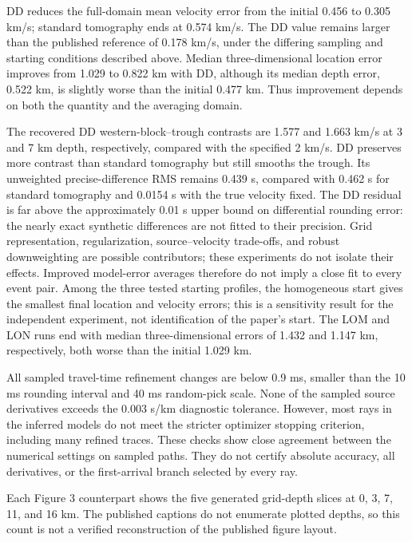 \documentclass[11pt]{article}
\begin{document}
DD reduces the full-domain mean velocity error from the initial 0.456 to
0.305 km/s; standard tomography ends at 0.574 km/s. The DD value remains
larger than the published reference of 0.178 km/s, under the differing
sampling and starting conditions described above. Median three-dimensional
location error improves from 1.029 to 0.822 km with DD, although its median
depth error, 0.522 km, is slightly worse than the initial 0.477 km.
Thus improvement depends on both the quantity and the averaging domain.

The recovered DD western-block--trough contrasts are 1.577 and 1.663 km/s
at 3 and 7 km depth, respectively, compared with the specified 2 km/s.
DD preserves more contrast than standard tomography but still smooths the
trough. Its unweighted precise-difference RMS remains 0.439 s, compared with
0.462 s for standard tomography and 0.0154 s with the true velocity fixed.
The DD residual is far above the approximately 0.01 s upper bound on
differential rounding error: the nearly exact synthetic differences are
not fitted to their precision. Grid representation, regularization,
source--velocity trade-offs, and robust downweighting are possible
contributors; these experiments do not isolate their effects.
Improved model-error averages therefore do not imply a close fit to every
event pair. Among the three tested starting profiles, the homogeneous start
gives the smallest final location and velocity errors; this is a sensitivity
result for the independent experiment, not identification of the paper's start.
The LOM and LON runs end with median three-dimensional errors of 1.432 and
1.147 km, respectively, both worse than the initial 1.029 km.

All sampled travel-time refinement changes are below 0.9 ms, smaller than
the 10 ms rounding interval and 40 ms random-pick scale. None of the sampled
source derivatives exceeds the 0.003 s/km diagnostic tolerance. However,
most rays in the inferred models do not meet the stricter optimizer stopping
criterion, including many refined traces. These checks show close agreement
between the numerical settings on sampled paths. They do not certify
absolute accuracy, all derivatives, or the first-arrival branch selected
by every ray.

Each Figure 3 counterpart shows the five generated grid-depth slices at
0, 3, 7, 11, and 16 km. The published captions do not enumerate plotted
depths, so this count is not a verified reconstruction of the published
figure layout.
\end{document}
